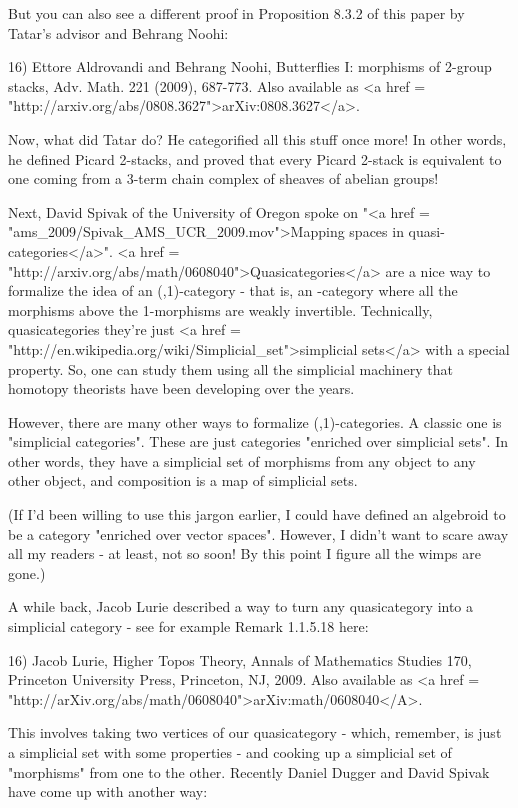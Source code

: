 But you can also see a different proof in Proposition 8.3.2 of
this paper by Tatar's advisor and Behrang Noohi:

16) Ettore Aldrovandi and Behrang Noohi, Butterflies I: morphisms of
2-group stacks, Adv. Math. 221 (2009), 687-773.  Also available as <a
href = "http://arxiv.org/abs/0808.3627">arXiv:0808.3627</a>.

Now, what did Tatar do?  He categorified all this stuff once more!
In other words, he defined Picard 2-stacks, and proved that every
Picard 2-stack is equivalent to one coming from a 3-term chain
complex of sheaves of abelian groups!  

Next, David Spivak of the University of Oregon spoke on "<a href
= "ams_2009/Spivak_AMS_UCR_2009.mov">Mapping spaces in
quasi-categories</a>".  <a href =
"http://arxiv.org/abs/math/0608040">Quasicategories</a> are a nice way
to formalize the idea of an (\infty ,1)-category - that is, an
\infty -category where all the morphisms above the 1-morphisms are
weakly invertible.  Technically, quasicategories they're just <a href
= "http://en.wikipedia.org/wiki/Simplicial_set">simplicial sets</a>
with a special property.  So, one can study them using all the
simplicial machinery that homotopy theorists have been developing over
the years.

However, there are many other ways to formalize
(\infty ,1)-categories.  A classic one is "simplicial
categories".  These are just categories "enriched over
simplicial sets".  In other words, they have a simplicial set of
morphisms from any object to any other object, and composition is a
map of simplicial sets.

(If I'd been willing to use this jargon earlier, I could have defined
an algebroid to be a category "enriched over vector spaces".
However, I didn't want to scare away all my readers - at least, not so
soon!  By this point I figure all the wimps are gone.)

A while back, Jacob Lurie described a way to turn any quasicategory
into a simplicial category - see for example Remark 1.1.5.18 here:

16) Jacob Lurie, Higher Topos Theory, Annals of Mathematics Studies
170, Princeton University Press, Princeton, NJ, 2009.  Also available
as <a href =
"http://arXiv.org/abs/math/0608040">arXiv:math/0608040</A>.

This involves taking two vertices of our quasicategory - which,
remember, is just a simplicial set with some properties - and
cooking up a simplicial set of "morphisms" from one to the other.
Recently Daniel Dugger and David Spivak have come up with another
way:

